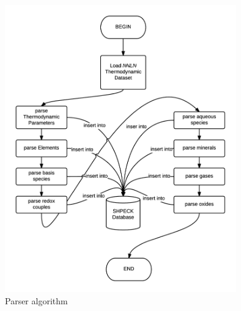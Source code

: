 \begin{figure}[ht!]
\centering
\includegraphics[width=100mm]{figures/parser.png}
\caption{Parser algorithm}
\label{fig:parserAlgorithm}
\end{figure}

\newpage

